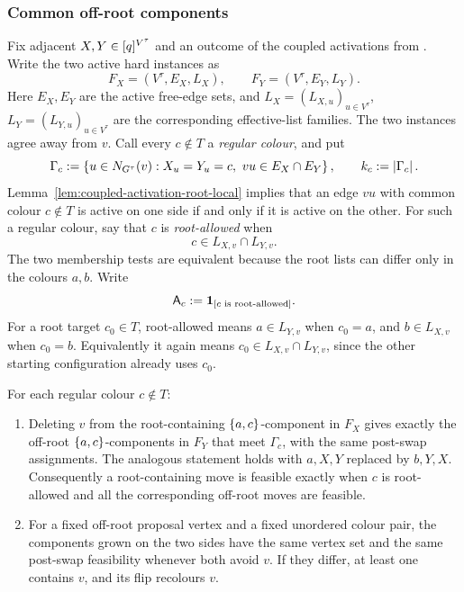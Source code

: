 \subsubsection{Common off-root components}
Fix adjacent \(X,Y\in[q]^{V^\tau}\) and an outcome of the coupled activations from
.  Write the two active hard
instances as
\[
  F_X=(V^\tau,E_X,L_X),\qquad F_Y=(V^\tau,E_Y,L_Y).
\]
Here \(E_X,E_Y\) are the active free-edge sets, and
\(L_X=(L_{X,u})_{u\in V^\tau}\), \(L_Y=(L_{Y,u})_{u\in V^\tau}\)
are the corresponding effective-list families.  The two instances agree
away from $v$.  Call every \(c\notin T\) a
\emph{regular colour}, and put
\[
  \Gamma_c:=\left\{u\in N_{G^\tau}(v):
      X_u=Y_u=c,\ vu\in E_X\cap E_Y\right\},\qquad k_c:=\left|\Gamma_c\right|.
\]
Lemma~\ref{lem:coupled-activation-root-local} implies that an edge $vu$ with common colour
$c\notin T$ is active on one side if and only if it is active on the other.
For such a regular colour, say that \(c\) is \emph{root-allowed} when
\[
  c\in L_{X,v}\cap L_{Y,v}.
\]
The two membership tests are equivalent because the root lists can differ
only in the colours \(a,b\).  Write
\[
  \mathsf A_c:=\mathbf{1}_{\left[c\text{ is root-allowed}\right]}.
\]
For a root target \(c_0\in T\), root-allowed
means \(a\in L_{Y,v}\) when \(c_0=a\), and \(b\in L_{X,v}\) when \(c_0=b\).
Equivalently it again means \(c_0\in L_{X,v}\cap L_{Y,v}\), since the other
starting configuration already uses \(c_0\).

\begin{lemma}\label{lem:cv-root-local-structure}
For each regular colour $c\notin T$:
\begin{enumerate}
\item Deleting $v$ from the root-containing $\left\{a,c\right\}$-component in
  $F_X$ gives exactly the off-root $\left\{a,c\right\}$-components in $F_Y$ that
  meet $\Gamma_c$, with the same post-swap assignments.  The analogous
  statement holds with $a,X,Y$ replaced by $b,Y,X$.  Consequently a
  root-containing move is feasible exactly when $c$ is root-allowed
  and all the corresponding off-root moves are feasible.
\item For a fixed off-root proposal vertex and a fixed unordered colour
  pair, the components grown on the two sides have the same vertex set and
  the same post-swap feasibility whenever both avoid $v$.  If they differ,
  at least one contains $v$, and its flip recolours $v$.
\end{enumerate}
\end{lemma}

